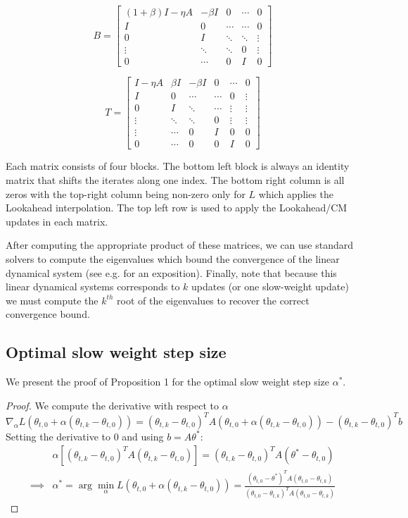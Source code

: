 \[ 
B =
\left[\begin{array}{ccccc}
(1 + \beta) I - \eta A & -\beta I & 0 & \cdots  & 0 \\
I & 0 & \cdots & \cdots & 0 \\
0 & I & \ddots &\ddots & \vdots \\
\vdots & \ddots & \ddots &  0 & \vdots \\
0 & \cdots & 0 & I & 0
\end{array}\right]
\]

\[ 
T =
\left[\begin{array}{cccccc}
I - \eta A & \beta I & -\beta I & 0 & \cdots & 0 \\
I & 0 & \cdots & \cdots & 0 & \vdots\\
0 & I & \ddots &  \cdots & \vdots & \vdots\\
\vdots & \ddots & \ddots &  0 & \vdots & \vdots \\
\vdots & \cdots & 0 & I & 0 & 0 \\
0 & \cdots & 0 & 0 & I & 0
\end{array}\right]
\]

Each matrix consists of four blocks. The bottom left block is always an identity matrix that shifts the iterates along one index. The bottom right column is all zeros with the top-right column being non-zero only for $L$ which applies the Lookahead interpolation. The top left row is used to apply the Lookahead/CM updates in each matrix.

After computing the appropriate product of these matrices, we can use standard solvers to compute the eigenvalues which bound the convergence of the linear dynamical system (see e.g. \citet{lessard2016analysis} for an exposition). Finally, note that because this linear dynamical systems corresponds to $k$ updates (or one slow-weight update) we must compute the $k^{th}$ root of the eigenvalues to recover the correct convergence bound.

\subsection{Optimal slow weight step size}
\label{app:optimal-slow}
We present the proof of Proposition 1 for the optimal slow weight step size $\alpha^*$.

\begin{proof}
We compute the derivative with respect to $\alpha$ 
\[\nabla_{\alpha} L(\theta_{t,0} + \alpha (\theta_{t,k} - \theta_{t,0}))
=  (\theta_{t,k} - \theta_{t,0})^T A (\theta_{t,0} + \alpha (\theta_{t,k} - \theta_{t,0})) - (\theta_{t,k} - \theta_{t,0})^T b\]
Setting the derivative to 0 and using $b = A \theta^*$:
\begin{align}
    &\alpha [ (\theta_{t,k} - \theta_{t,0})^T A  (\theta_{t,k} - \theta_{t,0})] =  (\theta_{t,k} - \theta_{t,0})^T A (\theta^* - \theta_{t,0}) \\ 
    \implies &\alpha^* = \arg \min_{\alpha} L(\theta_{t,0} + \alpha (\theta_{t,k} - \theta_{t,0})) = \frac{(\theta_{t,0} - \theta^*)^T A(\theta_{t,0} - \theta_{t, k})}{(\theta_{t,0}  - \theta_{t,k})^T A (\theta_{t,0} - \theta_{t,k})}  
\end{align}
\end{proof}

